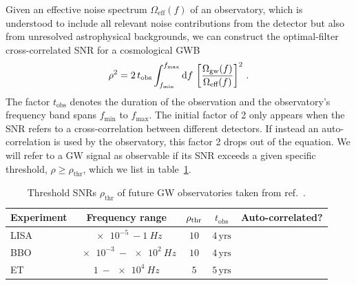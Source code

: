 Given an effective noise spectrum $\Omega_\text{eff}(f)$ of an  observatory, which is understood to include all relevant noise contributions from the detector but also from unresolved astrophysical backgrounds, we can construct the optimal-filter cross-correlated \ac{SNR} for a cosmological \ac{GWB}
\begin{align}
	\rho^2 = 2 \, t_\text{obs} \int_{f_\text{min}}^{f_\text{max}} \mathop{}\!\mathrm{d} f\, \left[ \frac{ \Omega_{\text{gw}}(f)}
		{\Omega_\text{eff}(f)}  \right]^2 \, .
	\label{eq:SNR}
\end{align}
The factor $t_\text{obs}$ denotes the duration of the observation and the observatory's frequency band spans $f_\text{min}$ to $f_\text{max}$. The initial factor of 2 only appears when the \ac{SNR} refers to a cross-correlation between different detectors. If instead an auto-correlation is used by the observatory, this factor 2 drops out of the equation. We will refer to a \ac{GW} signal as observable if its \ac{SNR} exceeds a given specific threshold, $\rho \ge \rho_\text{thr}$, which we list in table~\ref{tab:detectors}.

\begin{table}
	\centering
	\begin{tabular}{lcccc}
		\toprule
		Experiment      &               Frequency range               &    $\rho_\text{thr}$    &  $t_\text{obs}$   & Auto-correlated? \\ \hline
		\acs{LISA}            & $\SI{e-5}{}-\SI{1}{Hz}$ & $10$& $4 \, \text{yrs}$ & \cmark                          \\
		\acs{BBO}             & $\SI{e-3}{}-\SI{e2}{Hz}$ &          $10$           & $4 \, \text{yrs}$ & \xmark                           \\
		\acs{ET}              &  $\SI{1}{}-\SI{e4}{Hz}$  & $5$  & $5 \, \text{yrs}$ & \cmark                          \\ \bottomrule
	\end{tabular}
	\caption{Threshold \acsp{SNR} $\rho_\text{thr}$ of future \ac{GW} observatories taken from ref.~\cite{Breitbach:2018ddu}.}
	\label{tab:detectors}
\end{table}

